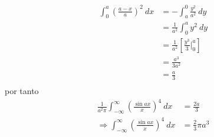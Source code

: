 \documentclass[12pt]{report}
\theoremstyle{largebreak}
\begin{document}
\begin{sol}
\begin{equation*}
            \begin{split}
                \int_{0}^a\left(\frac{a-x}{a}\right)^2\:dx&=-\int_{a}^0\frac{y^2}{a^2}\:dy\\
                &=\frac{1}{a^2}\int_{0}^{a}y^2\:dy\\
                &=\frac{1}{a^2}\left[\frac{y^3}{3}\Big|_{ 0}^{a}\right]\\
                &=\frac{a^3}{3a^2}\\
                &=\frac{a}{3}\\
            \end{split}
        \end{equation*}
        por tanto
        \begin{equation*}
            \begin{split}
                \frac{1}{a^2\pi}\int_{ -\infty}^{\infty}\left(\frac{\sin ax}{x}\right)^4\:dx&=\frac{2a}{3}\\
                \Rightarrow \int_{ -\infty}^{\infty}\left(\frac{\sin ax}{x}\right)^4\:dx&=\frac{2}{3}\pi a^3\\
            \end{split}
        \end{equation*}


\end{sol}
\end{document}
